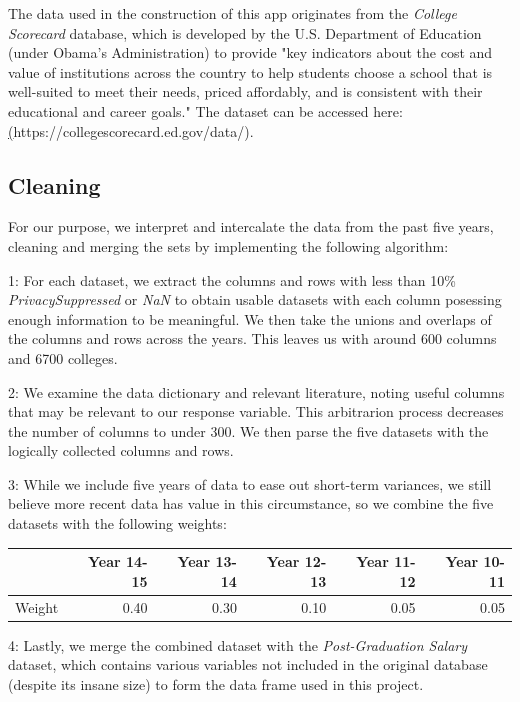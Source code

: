 \documentclass{article}\usepackage[]{graphicx}\usepackage[]{color}
\begin{document}
The data used in the construction of this app originates from the \emph{College Scorecard} database, which is developed by the U.S. Department of Education (under Obama's Administration) to provide "key indicators about the cost and value of institutions across the country to help students choose a school that is well-suited to meet their needs, priced affordably, and is consistent with their educational and career goals." The dataset can be accessed here: \href{https://collegescorecard.ed.gov/data/}(https://collegescorecard.ed.gov/data/).

\subsection{Cleaning}
For our purpose, we interpret and intercalate the data from the past five years, cleaning and merging the sets by implementing the following algorithm:\newline

1: For each dataset, we extract the columns and rows with less than 10\% \emph{PrivacySuppressed} or \emph{NaN} to obtain usable datasets with each column posessing enough information to be meaningful. We then take the unions and overlaps of the columns and rows across the years. This leaves us with around 600 columns and 6700 colleges.\newline


2: We examine the data dictionary and relevant literature, noting useful columns that may be relevant to our response variable. This arbitrarion process decreases the number of columns to under 300. We then parse the five datasets with the logically collected columns and rows.\newline

3: While we include five years of data to ease out short-term variances, we still believe more recent data has value in this circumstance, so we combine the five datasets with the following weights:

\begin{table}[ht]
\centering
\begin{tabular}{rrrrrr}
  \hline
 & Year 14-15 & Year 13-14 & Year 12-13 & Year 11-12 & Year 10-11 \\ 
  \hline
Weight & 0.40 & 0.30 & 0.10 & 0.05 & 0.05 \\ 
   \hline
\end{tabular}
\end{table}


4: Lastly, we merge the combined dataset with the \emph{Post-Graduation Salary} dataset, which contains various variables not included in the original database (despite its insane size) to form the data frame used in this project. 
\end{document}
